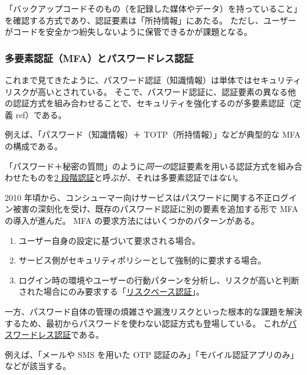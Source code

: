 \documentclass[uplatex]{jsarticle}
\def\ref#1{ref}%
\def\label#1{}%
\begin{document}
「バックアップコードそのもの（を記録した媒体やデータ）を持っていること」を確認する方式であり、認証要素は「所持情報」にあたる。
ただし、ユーザーがコードを安全かつ紛失しないように保管できるかが課題となる。

\subsubsection{多要素認証（MFA）とパスワードレス認証}

これまで見てきたように、パスワード認証（知識情報）は単体ではセキュリティリスクが高いとされている。
そこで、パスワード認証に、認証要素の異なる他の認証方式を組み合わせることで、セキュリティを強化するのが多要素認証（定義 \ref{dfn:mfa}）である。

\begin{exa}\label{exa:ch2-mfa-config}
例えば、「パスワード（知識情報）＋ TOTP（所持情報）」などが典型的な MFA の構成である。
\end{exa}

\begin{dfn}[2 段階認証]\label{dfn:ch2-two-step}
「パスワード＋秘密の質問」のように\emph{同一の}認証要素を用いる認証方式を組み合わせたものを\underline{2 段階認証}と呼ぶが、それは多要素認証では\emph{ない}。
\end{dfn}

2010 年頃から、コンシューマー向けサービスはパスワードに関する不正ログイン被害の深刻化を受け、既存のパスワード認証に別の要素を追加する形で MFA の導入が進んだ。
MFA の要求方法にはいくつかのパターンがある。
\begin{enumerate}
\item ユーザー自身の設定に基づいて要求される場合。
\item サービス側がセキュリティポリシーとして強制的に要求する場合。
\item ログイン時の環境やユーザーの行動パターンを分析し、リスクが高いと判断された場合にのみ要求する「\underline{リスクベース認証}」。
\end{enumerate}

\begin{dfn}[パスワードレス認証]\label{dfn:passwordless}
一方、パスワード自体の管理の煩雑さや漏洩リスクといった根本的な課題を解決するため、最初からパスワードを使わない認証方式も登場している。
これが\underline{パスワードレス認証}である。
\end{dfn}

\begin{exa}[パスワードレス認証の例]\label{exa:ch2-passwordless-examples}
例えば、「メールや SMS を用いた OTP 認証のみ」「モバイル認証アプリのみ」などが該当する。
\end{exa}
\end{document}
